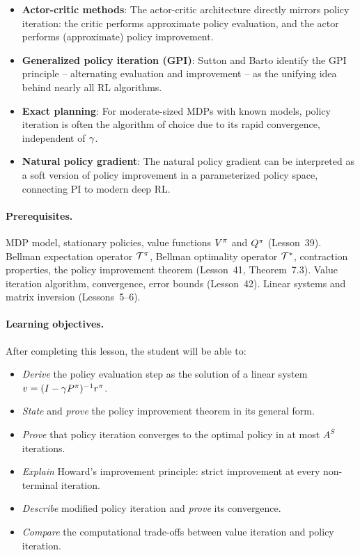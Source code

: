 \documentclass[11pt,a4paper]{article}
\begin{document}
\begin{rlconnection}[title={Why Policy Iteration Matters for RL/ML}]
\begin{itemize}[nosep]
    \item \textbf{Actor-critic methods}: The actor-critic architecture
    directly mirrors policy iteration: the critic performs approximate
    policy evaluation, and the actor performs (approximate) policy
    improvement.
    \item \textbf{Generalized policy iteration (GPI)}: Sutton and Barto
    identify the GPI principle -- alternating evaluation and
    improvement -- as the unifying idea behind nearly all RL algorithms.
    \item \textbf{Exact planning}: For moderate-sized MDPs with known
    models, policy iteration is often the algorithm of choice due to
    its rapid convergence, independent of $\gamma$.
    \item \textbf{Natural policy gradient}: The natural policy gradient
    can be interpreted as a soft version of policy improvement in a
    parameterized policy space, connecting PI to modern deep RL.
\end{itemize}
\end{rlconnection}

\paragraph{Prerequisites.}
MDP model, stationary policies, value functions $V^{\pi}$ and $Q^{\pi}$
(Lesson~39). Bellman expectation operator $\mathcal{T}^\pi$, Bellman
optimality operator $\mathcal{T}^*$, contraction properties, the policy
improvement theorem (Lesson~41, Theorem~7.3). Value iteration
algorithm, convergence, error bounds (Lesson~42). Linear systems and
matrix inversion (Lessons~5--6).

\paragraph{Learning objectives.}
After completing this lesson, the student will be able to:
\begin{itemize}
    \item \emph{Derive} the policy evaluation step as the solution of
    a linear system $v = (I - \gamma P^\pi)^{-1} r^\pi$.
    \item \emph{State} and \emph{prove} the policy improvement theorem
    in its general form.
    \item \emph{Prove} that policy iteration converges to the optimal
    policy in at most $A^S$ iterations.
    \item \emph{Explain} Howard's improvement principle: strict
    improvement at every non-terminal iteration.
    \item \emph{Describe} modified policy iteration and \emph{prove}
    its convergence.
    \item \emph{Compare} the computational trade-offs between value
    iteration and policy iteration.
\end{itemize}
\end{document}

